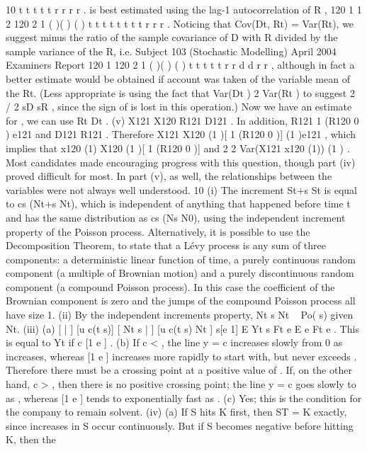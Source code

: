 \documentclass[a4paper,12pt]{article}
\begin{document}
\begin{enumerate}
10 t t t t t r r r r .
is best estimated using the lag-1 autocorrelation of R ,
120
1 1
2
120
2
1
( )( )
( )
t t t t
t
t t
t
r r
r
.
Noticing that Cov(Dt, Rt) = Var(Rt), we suggest minus the ratio of the
sample covariance of D with R divided by the sample variance of the R, i.e.
Subject 103 (Stochastic Modelling) April 2004 Examiners Report
120
1
120
2
1
( )( )
( )
t t
t
t
t
r r d d
r r
, although in fact a better estimate would be obtained if account was taken of the variable mean of the Rt.
(Less appropriate is using the fact that Var(Dt ) 2 Var(Rt ) to suggest 2 / 2 sD sR , since the sign of is lost in this operation.)
Now we have an estimate for , we can use Rt Dt .
(v) X121 X120 R121 D121 . In addition, R121 1 (R120 0 ) e121 and
D121 R121 .
Therefore X121 X120 (1 )[ 1 (R120 0 )] (1 )e121 , which
implies that x120 (1) X120 (1 )[ 1 (R120 0 )]
and 2 2
Var(X121 x120 (1)) (1 ) .
Most candidates made encouraging progress with this question, though part (iv) proved difficult for most. In part (v), as well, the relationships between the variables were not
always well understood.
10 (i) The increment St+s St is equal to cs (Nt+s Nt), which is independent of
anything that happened before time t and has the same distribution as
cs (Ns N0), using the independent increment property of the Poisson
process.
Alternatively, it is possible to use the Decomposition Theorem, to state that a
Lévy process is any sum of three components: a deterministic linear function
of time, a purely continuous random component (a multiple of Brownian
motion) and a purely discontinuous random component (a compound Poisson
process). In this case the coefficient of the Brownian component is zero and
the jumps of the compound Poisson process all have size 1.
(ii) By the independent increments property, Nt s Nt ~ Po( s) given Nt.
(iii) (a) [ | ] [u c(t s)] [ Nt s | ] [u c(t s) Nt ] s[e 1]
E Yt s Ft e E e Ft e .
This is equal to Yt if c [1 e ] .
(b) If c < , the line y = c increases slowly from 0 as increases,
whereas [1 e ] increases more rapidly to start with, but never 
exceeds . Therefore there must be a crossing point at a positive value
of .
If, on the other hand, c > , then there is no positive crossing point; the
line y = c goes slowly to as , whereas [1 e ] tends to
exponentially fast as .
(c) Yes; this is the condition for the company to remain solvent.
(iv) (a) If S hits K first, then ST = K exactly, since increases in S occur continuously. But if S becomes negative before hitting K, then the

\end{enumerate}
\end{document}
